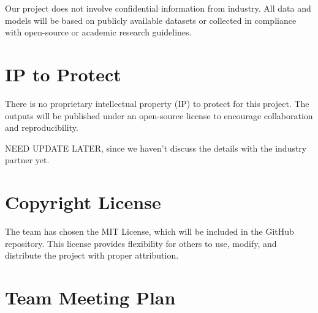 \documentclass{article}
\begin{document}
Our project does not involve confidential information from industry. 
All data and models will be based on publicly available datasets or 
collected in compliance with open-source or academic research guidelines.

\section{IP to Protect}


There is no proprietary intellectual property (IP) to protect for this project. 
The outputs will be published under an open-source license to encourage 
collaboration and reproducibility.

NEED UPDATE LATER, since we haven't discuss the details with the industry partner yet.

\section{Copyright License}


The team has chosen the MIT License, which will be included in the GitHub 
repository. This license provides flexibility for others to use, modify, 
and distribute the project with proper attribution.


\section{Team Meeting Plan}




\end{document}
